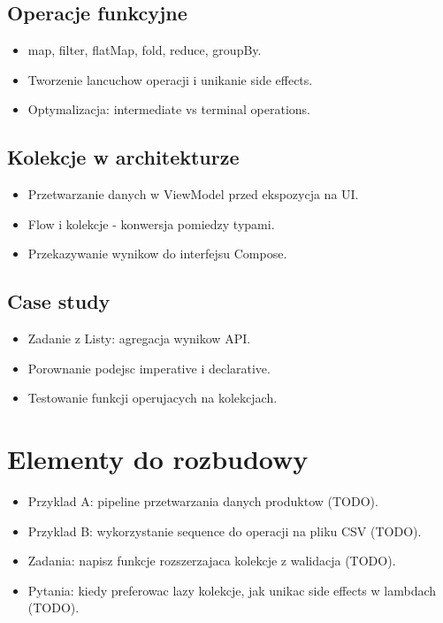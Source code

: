 \subsection{Operacje funkcyjne}
\begin{itemize}
  \item map, filter, flatMap, fold, reduce, groupBy.
  \item Tworzenie lancuchow operacji i unikanie side effects.
  \item Optymalizacja: intermediate vs terminal operations.
\end{itemize}

\subsection{Kolekcje w architekturze}
\begin{itemize}
  \item Przetwarzanie danych w ViewModel przed ekspozycja na UI.
  \item Flow i kolekcje - konwersja pomiedzy typami.
  \item Przekazywanie wynikow do interfejsu Compose.
\end{itemize}

\subsection{Case study}
\begin{itemize}
  \item Zadanie z Listy: agregacja wynikow API.
  \item Porownanie podejsc imperative i declarative.
  \item Testowanie funkcji operujacych na kolekcjach.
\end{itemize}

\section{Elementy do rozbudowy}
\begin{itemize}
  \item Przyklad A: pipeline przetwarzania danych produktow (TODO).
  \item Przyklad B: wykorzystanie sequence do operacji na pliku CSV (TODO).
  \item Zadania: napisz funkcje rozszerzajaca kolekcje z walidacja (TODO).
  \item Pytania: kiedy preferowac lazy kolekcje, jak unikac side effects w lambdach (TODO).
\end{itemize}


